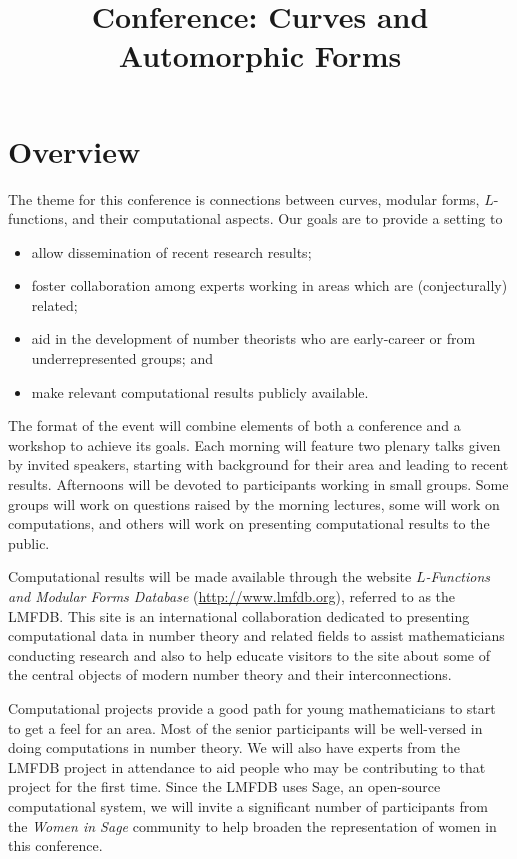 \documentclass[12pt]{amsart}
\title{Conference: Curves and Automorphic Forms}
\numberwithin{equation}{section}
\begin{document}
%


\section{Overview}

The theme for this conference is connections
between curves, modular forms, $L$-functions, and their computational
aspects.
Our goals are to provide a setting to
\begin{itemize}
\item allow dissemination of recent research results;
\item foster collaboration among experts working in areas which are
  (conjecturally) related;
\item aid in the development of number theorists who are early-career
  or from underrepresented groups; and 
\item make relevant computational results publicly available.
\end{itemize}

The format of the event will combine elements of both a conference and
a workshop to achieve its goals.  Each morning will feature two plenary
talks given by invited speakers, starting with background for their
area and leading to recent results.  Afternoons will be devoted to
participants working in small groups.  Some groups will work on
questions raised by the morning lectures, some will work on
computations, and others will work on presenting computational
results to the public.

Computational results will be made available through the website {\em
  $L$-Functions and Modular Forms Database}
(\url{http://www.lmfdb.org}), referred to as the \textsf{LMFDB}.
This site is an international collaboration dedicated to presenting
computational data in number theory and related fields to assist
mathematicians conducting research and also to help educate
visitors to the site about some of the central objects of modern
number theory and their interconnections.

Computational projects provide a good path for young mathematicians to
start to get a feel for an area.  Most of the senior
participants will be well-versed in doing computations in number
theory.  We will also have experts from the \textsf{LMFDB} project in
attendance to 
aid people who may be contributing to that project for the first
time.  Since the \textsf{LMFDB} uses \textsf{Sage}, an open-source
computational system, 
we will invite a significant number of participants from the {\em Women in
  Sage} community to help broaden the representation of women in this
conference.
\end{document}

